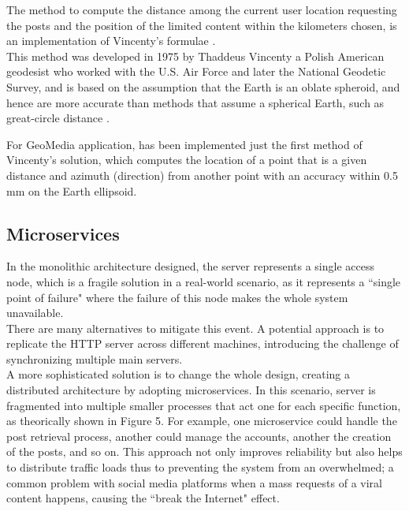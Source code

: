\documentclass[conference]{IEEEtran}
\begin{document}
The method to compute the distance among the current user location requesting the posts and the position of the limited content within the kilometers chosen, is an implementation of Vincenty's formulae \cite{Vincenty}.
\\
This method was developed in 1975 by Thaddeus Vincenty \cite{ThaddeusVincenty} a Polish American geodesist who worked with the U.S. Air Force and later the National Geodetic Survey, and is based on the assumption that the Earth is an oblate spheroid, and hence are more accurate than methods that assume a spherical Earth, such as great-circle distance \cite{GCDWiki}. 

For GeoMedia application, has been implemented just the first method of Vincenty's solution, which computes the location of a point that is a given distance and azimuth (direction) from another point with an accuracy within 0.5 mm on the Earth ellipsoid.


\subsection{Microservices}
In the monolithic architecture designed, the server represents a single access node, which is a fragile solution in a real-world scenario, as it represents a ``single point of failure" where the failure of this node makes the whole system unavailable.
\\
There are many alternatives to mitigate this event. A potential approach is to replicate the HTTP server across different machines, introducing the challenge of synchronizing multiple main servers.
\\
A more sophisticated solution is to change the whole design, creating a distributed architecture by adopting microservices\cite{b6}. In this scenario, server is fragmented into multiple smaller processes that act one for each specific function, as theorically shown in Figure 5.
For example, one microservice could handle the post retrieval process, another could manage the accounts, another the creation of the posts, and so on. This approach not only improves reliability but also helps to distribute traffic loads thus to preventing the system from an overwhelmed; a common problem with social media platforms when a mass requests of a viral content happens, causing the ``break the Internet" \cite{BreakTheInternet} effect.
\end{document}
